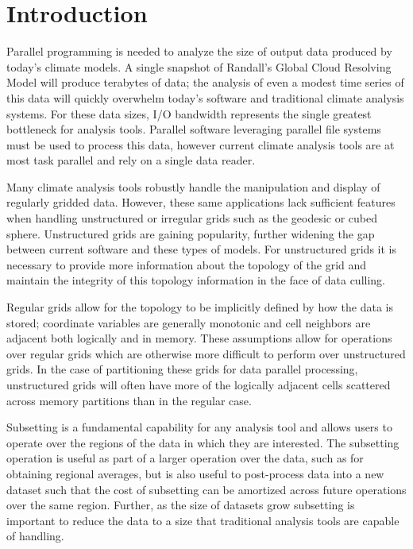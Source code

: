 \section{Introduction}
\label{section:introduction}

Parallel programming is needed to analyze the size of output data produced by
today's climate models\cite{MODSIM07:LOT}.  A single snapshot of Randall's
Global Cloud Resolving Model will produce terabytes of data\cite{GCRM}; the
analysis of even a modest time series of this data will quickly overwhelm
today's software and traditional climate analysis systems.  For these data
sizes, I/O bandwidth represents the single greatest bottleneck for analysis
tools.  Parallel software leveraging parallel file systems must be used to
process this data, however current climate analysis tools are at most task
parallel and rely on a single data reader\cite{CDAT,CDO,NCO}.

Many climate analysis tools robustly handle the manipulation and display of
regularly gridded data.  However, these same applications lack sufficient
features when handling unstructured or irregular grids such as the
geodesic\cite{GEODESIC} or cubed sphere\cite{CUBE}.  Unstructured grids are
gaining popularity, further widening the gap between current software and
these types of models.  For unstructured grids it is necessary to provide more
information about the topology of the grid and maintain the integrity of this
topology information in the face of data culling.

Regular grids allow for the topology to be implicitly defined by how
the data is stored; coordinate variables are generally monotonic and cell
neighbors are adjacent both logically and in memory. These assumptions allow
for operations over regular grids which are otherwise more difficult to
perform over unstructured grids. In the case of partitioning these grids for
data parallel processing, unstructured grids will often have more of the
logically adjacent cells scattered across memory partitions than in the
regular case.

Subsetting is a fundamental capability for any analysis tool and allows users
to operate over the regions of the data in which they are interested. The
subsetting operation is useful as part of a larger operation over the data,
such as for obtaining regional averages, but is also useful to post-process
data into a new dataset such that the cost of subsetting can be amortized
across future operations over the same region. Further, as the size of
datasets grow subsetting is important to reduce the data to a size that
traditional analysis tools are capable of handling. 

